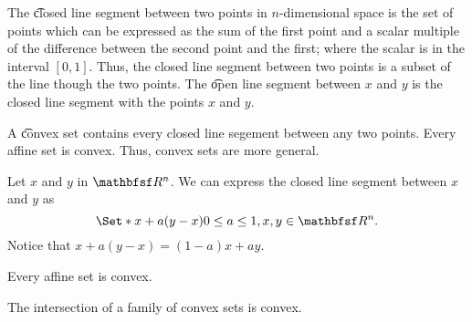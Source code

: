 
\sbasic































\sstart
{}




The \t{closed line segment between} two points in $n$-dimensional space is the set of points which can be expressed as the sum of the first point and a scalar multiple of the difference between the second point and the first; where the scalar is in the interval $[0, 1]$.
Thus, the closed line segment between two points is a subset of the line though the two points.
The \t{open line segment} between $x$ and $y$ is the closed line segment with the points $x$ and $y$.

A \t{convex set} contains every closed line segement between any two points.
Every affine set is convex.
Thus, convex sets are more general.


Let $x$ and $y$ in $\R^n$. We can express the closed line segment between $x$ and $y$ as
$$
  \Set*{x + a(y - x)}{0 \leq a \leq 1, x, y \in \R^n}.
$$
Notice that $x + a(y - x) = (1-a)x + ay$.


\begin{prop}
  Every affine set is convex.
\end{prop}

\begin{prop}
  The intersection of a family of convex sets is convex.
\end{prop}

